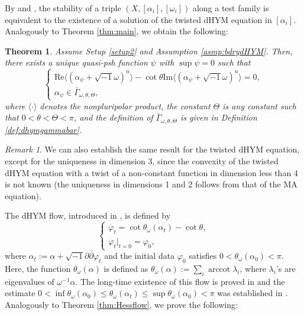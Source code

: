 \documentclass{amsart}
\numberwithin{equation}{section}
\theoremstyle{plain}
\newtheorem{thm}[equation]{Theorem}
\theoremstyle{definition}
\theoremstyle{remark}
\newtheorem{remark}[equation]{Remark}
\newcommand{\delb}{\sqrt{-1}\partial\bar{\partial}}
\begin{document}
By \cite[Theorem 1.3]{CLT} and \cite{Linb}, the stability of a triple $(X,[\alpha_i],[\omega_i])$ along a test family is equivalent to the existence of a solution of the twisted dHYM equation in $[\alpha_i]$. Analogously to Theorem \ref{thm:main}, we obtain the following:

\begin{thm}\label{thm:maindHYM}
    Assume Setup \ref{setup2} and Assumption \ref{asmp:bdrydHYM}. Then, there exists a unique quasi-psh function $\psi$ with $\sup\psi=0$ such that
    \begin{equation}\label{eq:dHYM}
        \begin{cases}
            \mathrm{Re}\langle(\alpha_\psi+\sqrt{-1}\omega)^n\rangle-\cot\theta\mathrm{Im}\langle(\alpha_\psi+\sqrt{-1}\omega)^n\rangle=0,\\
            \alpha_\psi\in\bar{\Gamma}_{\omega,\theta,\Theta},
        \end{cases}
    \end{equation}
    where $\langle\cdot\rangle$ denotes the nonpluripolar product, the constant $\Theta$ is any constant such that $0<\theta<\Theta<\pi$, and the definition of $\bar{\Gamma}_{\omega,\theta,\Theta}$ is given in Definition \ref{def:dhymgammabar}.
\end{thm}

\begin{remark}
        We can also establish the same result for the twisted dHYM equation, except for the uniqueness in dimension 3, since the convexity of the twisted dHYM equation with a twist of a non-constant function in dimension less than 4 is not known \cite[Proposition 5.6]{GChen} (the uniqueness in dimensions 1 and 2 follows from that of the MA equation).
\end{remark}

The dHYM flow, introduced in \cite{FYZ}, is defined by
\begin{equation*}
    \begin{cases}
        \dot{\varphi_t}=\cot\theta_\omega(\alpha_t)-\cot\theta,\\
        \varphi_t|_{t=0}=\varphi_0,
    \end{cases}
\end{equation*}
where $\alpha_t:=\alpha+\delb \varphi_t$ and the initial data $\varphi_0$ satisfies $0<\theta_\omega(\alpha_0)<\pi$. Here, the function $\theta_\omega(\alpha)$ is defined as  $\theta_\omega(\alpha):=\sum_i \operatorname{arccot}\lambda_i$, where $\lambda_i$'s are eigenvalues of $\omega^{-1}\alpha$.
The long-time existence of this flow is proved in \cite[Theorem 1.2]{FYZ} and the estimate $0<\inf\theta_\omega(\alpha_0)\le\theta_\omega(\alpha_t)\le\sup\theta_\omega(\alpha_0)<\pi$ was established in \cite[Lemma 3.2]{FYZ}.
Analogously to Theorem \ref{thm:Hessflow}, we prove the following:
\end{document}
